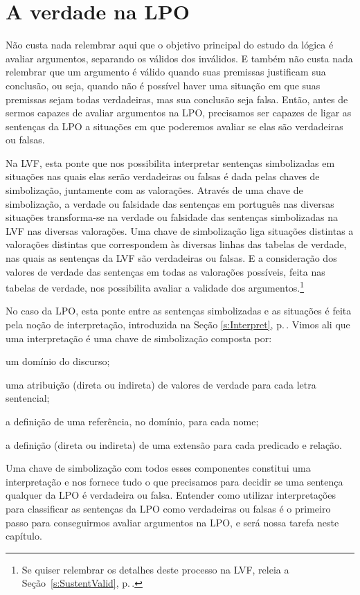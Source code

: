 \chapter{A verdade na LPO}\label{s:TruthFOL}
Não custa nada relembrar aqui que o objetivo principal do estudo da lógica é avaliar argumentos, separando os válidos dos inválidos.
E também não custa nada relembrar que um argumento é válido quando suas premissas justificam sua conclusão, ou seja, quando não é possível haver uma situação em que suas premissas sejam todas verdadeiras, mas sua conclusão seja falsa.
Então, antes de sermos capazes de avaliar argumentos na LPO, precisamos ser capazes de ligar as sentenças da LPO a situações em que poderemos avaliar se elas são verdadeiras ou falsas.

Na LVF, esta ponte que nos possibilita interpretar sentenças simbolizadas em situações nas quais elas serão verdadeiras ou falsas é dada pelas chaves de simbolização, juntamente com as valorações.
Através de uma chave de simbolização, a verdade ou falsidade das sentenças em português nas diversas situações transforma-se na verdade ou falsidade das sentenças simbolizadas na LVF nas diversas valorações.
Uma chave de simbolização liga situações distintas a valorações distintas que correspondem às diversas linhas das tabelas de verdade, nas quais as sentenças da LVF são verdadeiras ou falsas.
E a consideração dos valores de verdade das sentenças em todas as valorações possíveis, feita nas tabelas de verdade, nos possibilita avaliar a validade dos argumentos.\footnote{
	Se quiser relembrar os detalhes deste processo na LVF, releia a Seção~\ref{s:SustentValid}, p.\,\pageref{s:SustentValid}.}

No caso da LPO, esta ponte entre as sentenças simbolizadas e as situações é feita pela noção de interpretação, introduzida na Seção \ref{s:Interpret}, p.\,\pageref{s:Interpret}.
Vimos ali que uma interpretação é uma chave de simbolização composta por: 
\begin{ebullet}
	\item um domínio do discurso;
	\item uma atribuição (direta ou indireta) de valores de verdade para cada letra sentencial;
	\item a definição de uma referência, no domínio, para cada nome;
	\item a definição (direta ou indireta) de uma extensão para cada predicado e relação.
\end{ebullet}
Uma chave de simbolização com todos esses componentes constitui uma interpretação e nos fornece tudo o que precisamos para decidir se uma sentença qualquer da LPO é verdadeira ou falsa.
Entender como utilizar interpretações para classificar as sentenças da LPO como verdadeiras ou falsas é o primeiro passo para conseguirmos avaliar argumentos na LPO, e será nossa tarefa neste capítulo.

